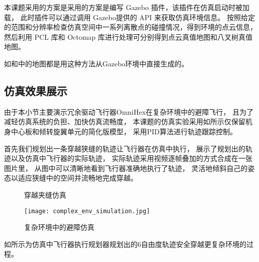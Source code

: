 本课题采用的方案是采用的方案是编写 Gazebo 插件，该插件在仿真启动时被加载，
此时插件可以通过调用 Gazebo提供的 API 来获取仿真环境信息。
按照给定的范围和分辨率检查仿真空间中一系列离散点的碰撞情况，得到环境的点云信息，
然后利用 PCL 库和 Octomap 库进行处理可分别得到点云真值地图和八叉树真值地图。

如和中的地图都是用这种方法从Gazebo环境中直接生成的。

\subsection{仿真效果展示}
由于本小节主要演示冗余驱动飞行器OmniHex在复杂环境中的避障飞行，
且为了减轻仿真系统的负担、加快仿真流畅度，
本课题的仿真实验采用如所示仅保留机身中心板和倾转旋翼单元的简化版模型，
采用PID算法进行轨迹跟踪控制。

首先我们规划出一条穿越狭缝的轨迹让飞行器在仿真中执行， 
展示了规划出的轨迹以及仿真中飞行器的实际轨迹，
实际轨迹采用视频逐帧叠加的方式合成在一张图片里，
从图中可以清晰地看到飞行器准确地执行了轨迹，
灵活地倾斜自己的姿态以适应狭缝中的空间并流畅地完成穿越。

\begin{figure}[!ht]
    \setlength{\subfigcapskip}{-1bp}
    \centering
    \begin{minipage}{\textwidth}
  
    \centering
    \subfigure{\label{fig:sim_narrow_gap_traj}}\addtocounter{subfigure}{-2}
    \hspace{0.2em}
    \subfigure{\label{fig:sim_narrow_gap_actual}}\addtocounter{subfigure}{-2}
    
    \end{minipage}
    \caption{穿越夹缝仿真}
    \label{fig:narrow_gap_simulation}
\end{figure}
\begin{figure}[ht]
    \centering
    \texttt{[image: complex\_env\_simulation.jpg]}
    \caption{复杂环境中的避障仿真}
    \label{fig:complex_env_simulation}
\end{figure}

如所示为仿真中飞行器执行规划器规划出的6自由度轨迹安全穿越更复杂环境的过程。

